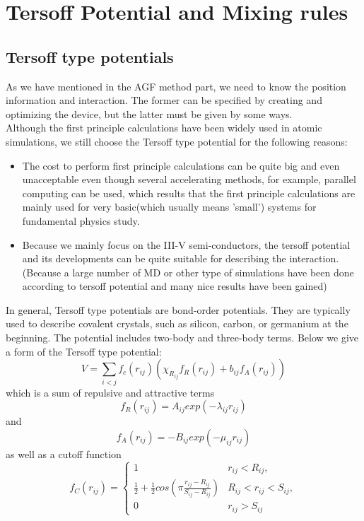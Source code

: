 \chapter{Tersoff Potential and Mixing rules}
\graphicspath{{Appendix3/}}
\section*{Tersoff type potentials}
As we have mentioned in the AGF method part, we need to know the position information and interaction. The former can be specified by creating and optimizing the device, but the latter must be given by some ways.\\
 Although the first principle calculations have been widely used in atomic simulations, we still choose the Tersoff type potential for the following reasons:
\begin{itemize}
\item The cost to perform first principle calculations can be quite big and even unacceptable even though several accelerating methods, for example, parallel computing can be used, which results that the first principle calculations are mainly used for very basic(which usually means 'small') systems for fundamental physics study.
\item Because we mainly focus on the III-V semi-conductors, the tersoff potential and its developments can be quite suitable for describing the interaction.(Because a large number of MD or other type of simulations have been done according to tersoff potential and many nice results have been gained)
\end{itemize}
In general, Tersoff type potentials are bond-order potentials\cite{tersoff1988new}.
They are typically used to describe covalent crystals, such as silicon, carbon, or germanium at the beginning. The potential includes two-body and three-body terms. Below we give a form of the Tersoff type potential:
\begin{equation*}
V= \sum_{i < j} f_c(r_{ij})(\chi_{R_{ij}} f_R(r_{ij})+b_{ij}f_A(r_{ij}))
\end{equation*}
which is a sum of repulsive and attractive terms
\begin{equation*}
f_R(r_{ij})=A_{ij}exp(-\lambda_{ij} r_{ij})
\end{equation*}
and
\begin{equation*}
f_A(r_{ij})=-B_{ij}exp(-\mu_{ij} r_{ij})
\end{equation*}
as well as a cutoff function
\begin{equation*}
f_C(r_{ij})=\left\{\begin{array}{ll}
1 & r_{ij}<R_{ij},\\
\frac{1}{2}+\frac{1}{2}cos(\pi \frac{r_{ij}-R_{ij}}{S_{ij}-R_{ij}}) &
R_{ij}<r_{ij}<S_{ij},\\
0 & r_{ij}>S_{ij}
\end{array}\right.
\end{equation*}

